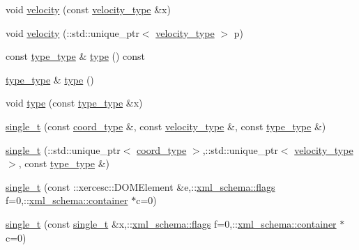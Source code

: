 \begin{DoxyCompactItemize}
\item 
void \hyperlink{classsingle__t_a3f97cd5cab3b100483d1a98ee95379fe}{velocity} (const \hyperlink{classsingle__t_a5aa793b7c32fb659668bbac250ce7d6b}{velocity\+\_\+type} \&x)
\item 
void \hyperlink{classsingle__t_a774ab1e29d33b94a6fb64a078b921414}{velocity} (\+::std\+::unique\+\_\+ptr$<$ \hyperlink{classsingle__t_a5aa793b7c32fb659668bbac250ce7d6b}{velocity\+\_\+type} $>$ p)
\item 
const \hyperlink{classsingle__t_a6ae5872727b5902a3907ef699bcc5ee0}{type\+\_\+type} \& \hyperlink{classsingle__t_a71ecdc5b5e9912a5f36a0efb4210f336}{type} () const 
\item 
\hyperlink{classsingle__t_a6ae5872727b5902a3907ef699bcc5ee0}{type\+\_\+type} \& \hyperlink{classsingle__t_adda2ad1ff7b84e24fe32bf2865ae9412}{type} ()
\item 
void \hyperlink{classsingle__t_a8e8b52c6863fc6777b03e2782fd23594}{type} (const \hyperlink{classsingle__t_a6ae5872727b5902a3907ef699bcc5ee0}{type\+\_\+type} \&x)
\item 
\hyperlink{classsingle__t_a95f4b77b3f49a5363d84e713c5c74f28}{single\+\_\+t} (const \hyperlink{classsingle__t_a07d764e683fbb0e8ddd97945f2c01270}{coord\+\_\+type} \&, const \hyperlink{classsingle__t_a5aa793b7c32fb659668bbac250ce7d6b}{velocity\+\_\+type} \&, const \hyperlink{classsingle__t_a6ae5872727b5902a3907ef699bcc5ee0}{type\+\_\+type} \&)
\item 
\hyperlink{classsingle__t_a5bf6773471fc02d9c47bfd4fd7f129f8}{single\+\_\+t} (\+::std\+::unique\+\_\+ptr$<$ \hyperlink{classsingle__t_a07d764e683fbb0e8ddd97945f2c01270}{coord\+\_\+type} $>$,\+::std\+::unique\+\_\+ptr$<$ \hyperlink{classsingle__t_a5aa793b7c32fb659668bbac250ce7d6b}{velocity\+\_\+type} $>$, const \hyperlink{classsingle__t_a6ae5872727b5902a3907ef699bcc5ee0}{type\+\_\+type} \&)
\item 
\hyperlink{classsingle__t_a130764d0ac93705cc451b79f2af2afbd}{single\+\_\+t} (const \+::xercesc\+::\+D\+O\+M\+Element \&e,\+::\hyperlink{namespacexml__schema_a0612287d030cb2732d31a45b258fdc87}{xml\+\_\+schema\+::flags} f=0,\+::\hyperlink{namespacexml__schema_ada9aa30dc722e93ee2ed7243085402a5}{xml\+\_\+schema\+::container} $\ast$c=0)
\item 
\hyperlink{classsingle__t_a94974f20fe6b61bf7c9c9466f7a6c472}{single\+\_\+t} (const \hyperlink{classsingle__t}{single\+\_\+t} \&x,\+::\hyperlink{namespacexml__schema_a0612287d030cb2732d31a45b258fdc87}{xml\+\_\+schema\+::flags} f=0,\+::\hyperlink{namespacexml__schema_ada9aa30dc722e93ee2ed7243085402a5}{xml\+\_\+schema\+::container} $\ast$c=0)

\end{DoxyCompactItemize}
